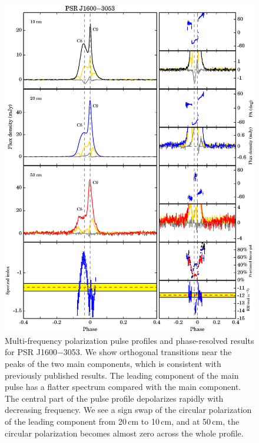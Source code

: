 \documentclass[useAMS,usenatbib]{mn2e}
\begin{document}
\begin{appendix}
\begin{figure}
\begin{center}
\includegraphics[width=6 in]{1600.ps}
\caption{Multi-frequency polarization pulse profiles and phase-resolved results for PSR J1600$-$3053. 
We show orthogonal transitions near the peaks of the two main 
components, which is consistent with previously published results.
%
The leading component of the main pulse has a flatter spectrum compared with 
the main component.
%
The central part of the pulse profile depolarizes rapidly with decreasing 
frequency. 
%
We see a sign swap of the circular polarization of the leading component 
from 20\,cm to 10\,cm, and at 50\,cm, the circular polarization becomes almost 
zero across the whole profile.
}
\label{1600}
\end{center}
\end{figure}


\end{appendix}
\end{document}
